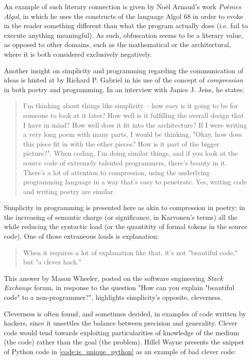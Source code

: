 An example of such literary connection is given by Noël Arnaud's work \emph{Poèmes Algol}\cite{arnaud_poemes_1968}, in which he uses the constructs of the language Algol 68 in order to evoke in the reader something different than what the program actually does (i.e. fail to execute anything meaningful). As such, obfuscation seems to be a literary value, as opposed to other domains, such as the mathematical or the architectural, where it is both considered exclusively negatively.

Another insight on simplicity and programming regarding the communication of ideas is hinted at by Richard P. Gabriel in his use of the concept of \emph{compression} in both poetry and programming. In an interview with Janice J. Jeiss, he states:

\begin{quote}
  I'm thinking about things like simplicity -- how easy is it going to be for someone to look at it later? How well is it fulfilling the overall design that I have in mind? How well does it fit into the architecture? If I were writing a very long poem with many parts, I would be thinking, "Okay, how does this piece fit in with the other pieces? How is it part of the bigger picture?". When coding, I'm doing similar things, and if you look at the source code of extremely talented programmers, there's beauty in it. There's a lot of attention to compression, using the underlying programming language in a way that's easy to penetrate. Yes, writing code and writing poetry are similar. \cite{jeiss_poetry_2002}
\end{quote}

Simplicity in programming is presented here as akin to compression in poetry: in the increasing of semantic charge (or significance, in Karvonen's terms) all the while reducing the syntactic load (or the quantitity of formal tokens in the source code). One of those extraneous loads is explanation:

\begin{quote}
  When it requires a lot of explanation like that, it's not "beautiful code," but "a clever hack."\cite{how_2013a}
\end{quote}

This answer by Mason Wheeler, posted on the software engineering \emph{Stack Exchange} forum, in response to the question "How can you explain "beautiful code" to a non-programmer?"\cite{how_2013a}, highlights simplicity's opposite, cleverness.

Cleverness is often found, and sometimes derided, in examples of  code written by hackers, since it unsettles the balance between precision and generality. Clever code would tend towards exploiting particularities of knowledge of the medium (the code) rather than the goal (the problem). Hillel Wayne presents the snippet of Python code in \ref{code:is_unique_python} as an example of bad clever code:

